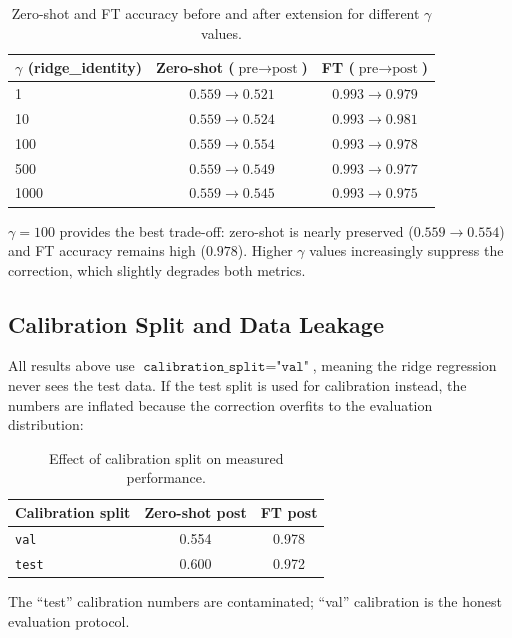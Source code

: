 \documentclass[11pt,a4paper]{article}
\begin{document}
\begin{table}[ht]
\centering
\caption{Zero-shot and FT accuracy before and after extension for different
$\gamma$ values.}
\label{tab:ridge_sweep}
\begin{tabular}{lcc}
\toprule
$\gamma$ (ridge\_identity) & Zero-shot ($\text{pre}\to\text{post}$) &
FT ($\text{pre}\to\text{post}$) \\
\midrule
1    & $0.559 \to 0.521$ & $0.993 \to 0.979$ \\
10   & $0.559 \to 0.524$ & $0.993 \to 0.981$ \\
100  & $0.559 \to 0.554$ & $0.993 \to 0.978$ \\
500  & $0.559 \to 0.549$ & $0.993 \to 0.977$ \\
1000 & $0.559 \to 0.545$ & $0.993 \to 0.975$ \\
\bottomrule
\end{tabular}
\end{table}

$\gamma = 100$ provides the best trade-off: zero-shot is nearly preserved
($0.559 \to 0.554$) and FT accuracy remains high ($0.978$). Higher
$\gamma$ values increasingly suppress the correction, which slightly
degrades both metrics.

\subsection{Calibration Split and Data Leakage}
\label{subsec:calib_split}

All results above use $\texttt{calibration\_split} = \texttt{"val"}$, meaning
the ridge regression never sees the test data. If the test split is used for
calibration instead, the numbers are inflated because the correction
overfits to the evaluation distribution:

\begin{table}[ht]
\centering
\caption{Effect of calibration split on measured performance.}
\label{tab:calib_split}
\begin{tabular}{lcc}
\toprule
Calibration split & Zero-shot post & FT post \\
\midrule
\texttt{val}  & 0.554 & 0.978 \\
\texttt{test} & 0.600 & 0.972 \\
\bottomrule
\end{tabular}
\end{table}

The ``test'' calibration numbers are contaminated; ``val'' calibration is the
honest evaluation protocol.
\end{document}
